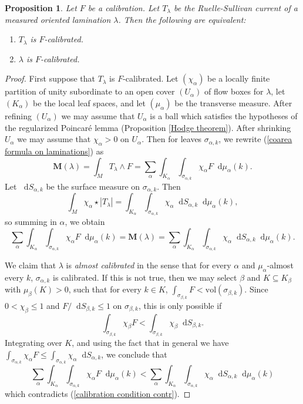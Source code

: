 \documentclass[reqno,11pt]{amsart}
\newcommand*\dif{\mathop{}\!\mathrm{d}}
\newcommand{\vol}{\mathrm{vol}}
\newcommand{\Mass}{\mathbf M}
\newcommand{\dfn}[1]{\emph{#1}\index{#1}}
\newtheorem{proposition}[theorem]{Proposition}
\theoremstyle{definition}
\numberwithin{equation}{section}
\begin{document}
\begin{proposition}\label{calibration condition}
Let $F$ be a calibration.
Let $T_\lambda$ be the Ruelle-Sullivan current of a measured oriented lamination $\lambda$.
Then the following are equivalent:
\begin{enumerate}
\item $T_\lambda$ is $F$-calibrated.
\item $\lambda$ is $F$-calibrated.
\end{enumerate}
\end{proposition}
\begin{proof}
First suppose that $T_\lambda$ is $F$-calibrated.
Let $(\chi_\alpha)$ be a locally finite partition of unity subordinate to an open cover $(U_\alpha)$ of flow boxes for $\lambda$, let $(K_\alpha)$ be the local leaf spaces, and let $(\mu_\alpha)$ be the transverse measure.
After refining $(U_\alpha)$ we may assume that $U_\alpha$ is a ball which satisfies the hypotheses of the regularized Poincar\'e lemma (Proposition \ref{Hodge theorem}). After shrinking $U_\alpha$ we may assume that $\chi_\alpha > 0$ on $U_\alpha$.
Then for leaves $\sigma_{\alpha,k}$, we rewrite (\ref{coarea formula on laminations}) as 
$$\Mass(\lambda) = \int_M T_\lambda \wedge F = \sum_\alpha \int_{K_\alpha} \int_{\sigma_{\alpha,k}} \chi_\alpha F \dif \mu_\alpha(k).$$
Let $\dif S_{\alpha,k}$ be the surface measure on $\sigma_{\alpha,k}$.
Then
$$\int_M \chi_\alpha \star |T_\lambda| = \int_{K_\alpha} \int_{\sigma_{\alpha,k}} \chi_\alpha \dif S_{\alpha,k} \dif \mu_\alpha(k),$$
so summing in $\alpha$, we obtain 
\begin{equation}\label{calibration condition contr}
\sum_\alpha \int_{K_\alpha} \int_{\sigma_{\alpha,k}} \chi_\alpha F \dif \mu_\alpha(k) = \Mass(\lambda) = \sum_\alpha \int_{K_\alpha} \int_{\sigma_{\alpha,k}} \chi_\alpha \dif S_{\alpha,k} \dif \mu_\alpha(k).
\end{equation}

We claim that $\lambda$ is \dfn{almost calibrated} in the sense that for every $\alpha$ and $\mu_\alpha$-almost every $k$, $\sigma_{\alpha, k}$ is calibrated.
If this is not true, then we may select $\beta$ and $K \subseteq K_\beta$ with $\mu_\beta(K) > 0$, such that for every $k \in K$, $\int_{\sigma_{\beta, k}} F < \vol(\sigma_{\beta, k})$.
Since $0 < \chi_\beta \leq 1$ and $F/\dif S_{\beta, k} \leq 1$ on $\sigma_{\beta, k}$, this is only possible if 
$$\int_{\sigma_{\beta, k}} \chi_\beta F < \int_{\sigma_{\beta, k}} \chi_\beta \dif S_{\beta, k}.$$
Integrating over $K$, and using the fact that in general we have $\int_{\sigma_{\alpha, k}} \chi_\alpha F \leq \int_{\sigma_{\alpha, k}} \chi_\alpha \dif S_{\alpha, k}$, we conclude that 
$$\sum_\alpha \int_{K_\alpha} \int_{\sigma_{\alpha, k}} \chi_\alpha F \dif \mu_\alpha(k) < \sum_\alpha \int_{K_\alpha} \int_{\sigma_{\alpha, k}} \chi_\alpha \dif S_{\alpha, k} \dif \mu_\alpha(k)$$
which contradicts (\ref{calibration condition contr}).


\end{proof}
\end{document}
